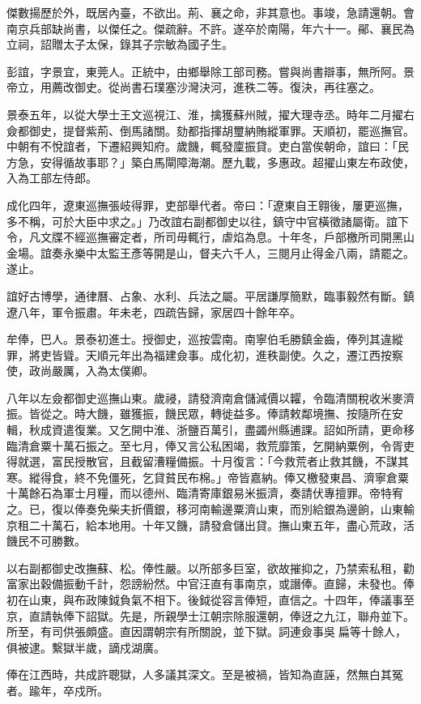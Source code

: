 \begin{pinyinscope}
傑數揚歷於外，既居內臺，不欲出。荊、襄之命，非其意也。事竣，急請還朝。會南京兵部缺尚書，以傑任之。傑疏辭。不許。遂卒於南陽，年六十一。鄖、襄民為立祠，詔贈太子太保，錄其子宗敏為國子生。

彭誼，字景宜，東莞人。正統中，由鄉舉除工部司務。嘗與尚書辯事，無所阿。景帝立，用薦改御史。從尚書石璞塞沙灣決河，進秩二等。復決，再往塞之。

景泰五年，以從大學士王文巡視江、淮，擒獲蘇州賊，擢大理寺丞。時年二月擢右僉都御史，提督紫荊、倒馬諸關。劾都指揮胡璽納賄縱軍罪。天順初，罷巡撫官。中朝有不悅誼者，下遷紹興知府。歲饑，輒發廩振貸。吏白當俟朝命，誼曰：「民方急，安得循故事耶？」築白馬閘障海潮。歷九載，多惠政。超擢山東左布政使，入為工部左侍郎。

成化四年，遼東巡撫張岐得罪，吏部舉代者。帝曰：「遼東自王翱後，屢更巡撫，多不稱，可於大臣中求之。」乃改誼右副都御史以往，鎮守中官橫徵諸屬衛。誼下令，凡文牒不經巡撫審定者，所司毋輒行，虐焰為息。十年冬，戶部檄所司開黑山金場。誼奏永樂中太監王彥等開是山，督夫六千人，三閱月止得金八兩，請罷之。遂止。

誼好古博學，通律曆、占象、水利、兵法之屬。平居謙厚簡默，臨事毅然有斷。鎮遼八年，軍令振肅。年未老，四疏告歸，家居四十餘年卒。

牟俸，巴人。景泰初進士。授御史，巡按雲南。南寧伯毛勝鎮金齒，俸列其違縱罪，將吏皆聳。天順元年出為福建僉事。成化初，進秩副使。久之，遷江西按察使，政尚嚴厲，入為太僕卿。

八年以左僉都御史巡撫山東。歲祲，請發濟南倉儲減價以糶，令臨清關稅收米麥濟振。皆從之。時大饑，雖獲振，饑民眾，轉徙益多。俸請敕鄰境撫、按隨所在安輯，秋成資遣復業。又乞開中淮、浙鹽百萬引，盡蠲州縣逋課。詔如所請，更命移臨清倉粟十萬石振之。至七月，俸又言公私困竭，救荒靡策，乞開納粟例，令胥吏得就選，富民授散官，且截留漕糧備振。十月復言：「今救荒者止救其饑，不謀其寒。縱得食，終不免僵死，乞貸貧民布棉。」帝皆嘉納。俸又檄發東昌、濟寧倉粟十萬餘石為軍士月糧，而以德州、臨清寄庫銀易米振濟，奏請伏專擅罪。帝特宥之。已，復以俸奏免柴夫折價銀，移河南輸邊粟濟山東，而別給銀為邊餉，山東輸京租二十萬石，給本地用。十年又饑，請發倉儲出貸。撫山東五年，盡心荒政，活饑民不可勝數。

以右副都御史改撫蘇、松。俸性嚴。以所部多巨室，欲故摧抑之，乃禁索私租，勸富家出穀備振動千計，怨謗紛然。中官汪直有事南京，或譖俸。直歸，未發也。俸初在山東，與布政陳鉞負氣不相下。後鉞從容言俸短，直信之。十四年，俸議事至京，直請執俸下詔獄。先是，所親學士江朝宗除服還朝，俸迓之九江，聯舟並下。所至，有司供張頗盛。直因謂朝宗有所關說，並下獄。詞連僉事吳扁等十餘人，俱被逮。繫獄半歲，謫戍湖廣。

俸在江西時，共成許聰獄，人多議其深文。至是被禍，皆知為直誣，然無白其冤者。踰年，卒戍所。


\end{pinyinscope}
